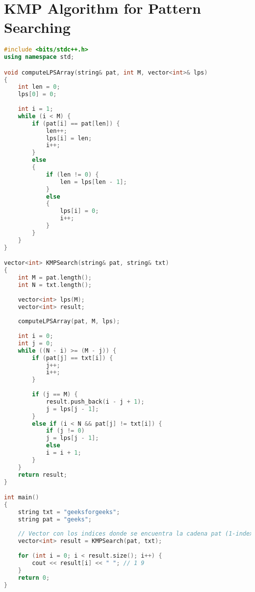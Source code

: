 
\section*{KMP Algorithm for Pattern Searching}

\begin{lstlisting}[language=C++]
#include <bits/stdc++.h>
using namespace std;

void computeLPSArray(string& pat, int M, vector<int>& lps)
{
	int len = 0;
	lps[0] = 0;
	
	int i = 1;
	while (i < M) {
		if (pat[i] == pat[len]) {
			len++;
			lps[i] = len;
			i++;
		}
		else 
		{
			if (len != 0) {
				len = lps[len - 1];
			}
			else
			{
				lps[i] = 0;
				i++;
			}
		}
	}
}

vector<int> KMPSearch(string& pat, string& txt)
{
	int M = pat.length();
	int N = txt.length();
	
	vector<int> lps(M);
	vector<int> result;
	
	computeLPSArray(pat, M, lps);
	
	int i = 0; 
	int j = 0; 
	while ((N - i) >= (M - j)) {
		if (pat[j] == txt[i]) {
			j++;
			i++;
		}
		
		if (j == M) {
			result.push_back(i - j + 1);
			j = lps[j - 1];
		}
		else if (i < N && pat[j] != txt[i]) {
			if (j != 0)
			j = lps[j - 1];
			else
			i = i + 1;
		}
	}
	return result;
}

int main()
{
	string txt = "geeksforgeeks";
	string pat = "geeks";
	
	// Vector con los indices donde se encuentra la cadena pat (1-indexado)
	vector<int> result = KMPSearch(pat, txt);
	
	for (int i = 0; i < result.size(); i++) {
		cout << result[i] << " "; // 1 9 
	}
	return 0;
}
\end{lstlisting}
	